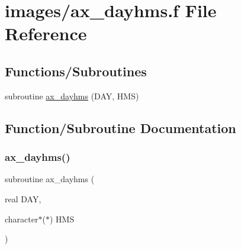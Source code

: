\hypertarget{ax__dayhms_8f}{}\section{images/ax\+\_\+dayhms.f File Reference}
\label{ax__dayhms_8f}
\subsection*{Functions/\+Subroutines}
\begin{DoxyCompactItemize}
\item 
subroutine \hyperlink{ax__dayhms_8f_a0115f12cb5f7b198d3b5245f8060fbb9}{ax\+\_\+dayhms} (D\+AY, H\+MS)
\end{DoxyCompactItemize}


\subsection{Function/\+Subroutine Documentation}
\mbox{\label{ax__dayhms_8f_a0115f12cb5f7b198d3b5245f8060fbb9}} 
\subsubsection{\texorpdfstring{ax\+\_\+dayhms()}{ax\_dayhms()}}
{\footnotesize\ttfamily subroutine ax\+\_\+dayhms (\begin{DoxyParamCaption}\item[{real}]{D\+AY,  }\item[{character$\ast$($\ast$)}]{H\+MS }\end{DoxyParamCaption})}

